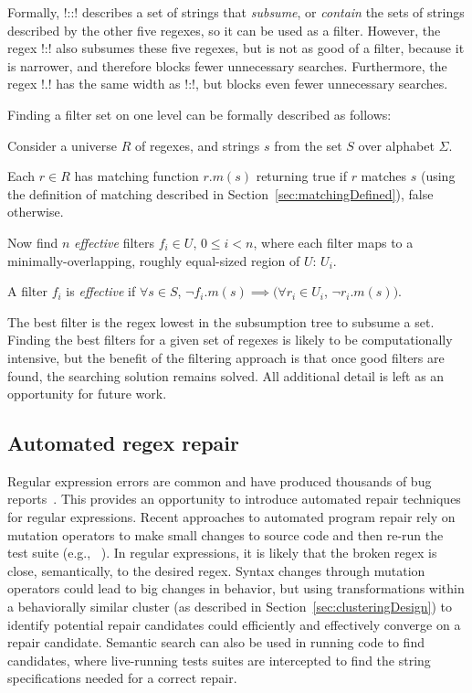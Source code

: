Formally, \cverb!::! describes a set of strings that \emph{subsume}, or \emph{contain} the sets of strings described by the other five regexes, so it can be used as a filter.  However, the regex \cverb!:! also subsumes these five regexes, but is not as good of a filter, because it is narrower, and therefore blocks fewer unnecessary searches.   Furthermore, the regex \cverb!.! has the same width as \cverb!:!, but blocks even fewer unnecessary searches.

Finding a filter set on one level can be formally described as follows:

Consider a universe $R$ of regexes, and strings $s$ from the set $S$ over alphabet $\Sigma$.

Each $r\in R$ has matching function $r.m(s)$ returning true if $r$ matches $s$ (using the definition of matching described in Section~\ref{sec:matchingDefined}), false otherwise.

Now find $n$ \emph{effective} filters $f_i \in U$, $ 0\leq i< n$, where each filter maps to a minimally-overlapping, roughly equal-sized region of $U$: $U_i$.

A filter $f_i$ is \emph{effective} if $\forall s\in S$, $ \neg f_i.m(s) \implies (\forall r_i \in U_i$, $ \neg r_i.m(s))$.

The best filter is the regex lowest in the subsumption tree to subsume a set.  Finding the best filters for a given set of regexes is likely to be computationally intensive, but the benefit of the filtering approach is that once good filters are found, the searching solution remains solved.  All additional detail is left as an opportunity for future work.

\subsection{Automated regex repair}  Regular expression errors are common and have produced thousands of bug reports~\cite{Spishak:2012:TSR:2318202.2318207}. This provides an opportunity to introduce automated repair techniques for regular expressions.
Recent approaches to automated program repair rely on mutation operators to make small changes to source code and then re-run the test suite (e.g., ~\cite{cacm10, genprog-tse-journal}). In regular expressions, it is likely that the broken regex is close, semantically, to the desired regex. Syntax changes through mutation operators could lead to big changes in behavior, but using transformations within a behaviorally similar cluster (as described in Section~\ref{sec:clusteringDesign}) to identify potential repair candidates could efficiently and effectively converge on a repair candidate.  Semantic search can also be used in running code to find candidates, where live-running tests suites are intercepted to find the string specifications needed for a correct repair.


